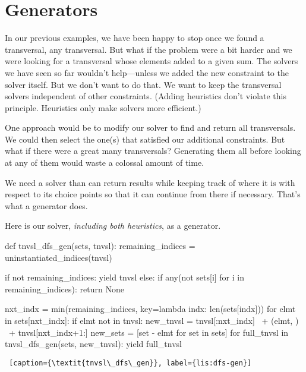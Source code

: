\section{Generators} \label{sec:generators}
In our previous examples, we have been happy to stop once we found a transversal,  any transversal. But what if the problem were a bit harder and we were looking for a transversal whose elements added to a given sum. The solvers we have seen so far wouldn't help---unless we added the new constraint to the solver itself. But we don't want to do that. We want to keep the transversal solvers independent of other constraints. (Adding heuristics don't violate this principle. Heuristics only make solvers more efficient.)

One approach would be to modify our solver to find and return all transversals. We could then select the one(s) that satisfied our additional constraints. But what if there were a great many transversals? Generating them all before looking at any of them would waste a colossal amount of time. 

We need a solver than can return results while keeping track of where it is with respect to its choice points so that it can continue from there if necessary. That's what a generator does. 

Here is our solver, \textit{including both heuristics}, as a generator.

\begin{minipage}[c]{0.45\textwidth}
\begin{python1}  
def tnvsl_dfs_gen(sets, tnvsl):
  remaining_indices = uninstantiated_indices(tnvsl)

  if not remaining_indices: yield tnvsl
  else:
    if any(not sets[i] for i in remaining_indices):
      return None
      
    nxt_indx = min(remaining_indices,
                   key=lambda indx: len(sets[indx]))
    for elmt in sets[nxt_indx]:
      if elmt not in tnvsl:
        new_tnvsl = tnvsl[:nxt_indx] \
                    + (elmt, ) \
                    + tnvsl[nxt_indx+1:]
        new_sets = [set - {elmt} for set in sets]
        for full_tnvsl in tnvsl_dfs_gen(sets, 
                                        new_tnvsl):
          yield full_tnvsl
\end{python1}\linv
\begin{lstlisting} [caption={\textit{tnvsl\_dfs\_gen}}, label={lis:dfs-gen}]
\end{lstlisting}
\end{minipage}

